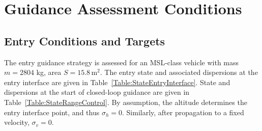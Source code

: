 \chapter{Guidance Assessment Conditions}\label{Ch:AssessmentConditions}

\section{Entry Conditions and Targets}
The entry guidance strategy is assessed for an MSL-class vehicle with mass$m = 2804$ kg, area $S = 15.8\, \mathrm{m}^2$. The entry state and associated dispersions at the entry interface are given in Table~\ref{Table:StateEntryInterface}. State and dispersions at the start of closed-loop guidance are given in Table~\ref{Table:StateRangeControl}. 
By assumption, the altitude determines the entry interface point, and thus $\sigma_h = 0$. Similarly, after propagation to a fixed velocity, $\sigma_v = 0$.
